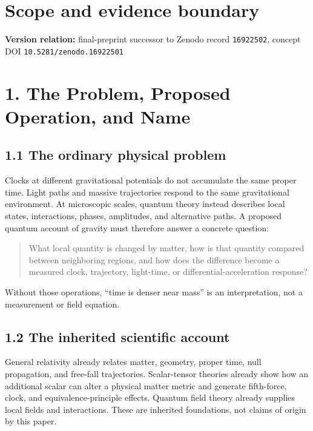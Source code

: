 \documentclass[
  american,
  11pt,
  letterpaper,
]{article}
\begin{document}
\section{Scope and evidence boundary}\label{scope-and-evidence-boundary}

\textbf{Version relation:} final-preprint successor to Zenodo record \texttt{16922502}, concept DOI \nolinkurl{10.5281/zenodo.16922501}

\section{1. The Problem, Proposed Operation, and Name}\label{the-problem-proposed-operation-and-name}

\subsection{1.1 The ordinary physical problem}\label{the-ordinary-physical-problem}

Clocks at different gravitational potentials do not accumulate the same proper time. Light paths and massive trajectories respond to the same gravitational environment. At microscopic scales, quantum theory instead describes local states, interactions, phases, amplitudes, and alternative paths. A proposed quantum account of gravity must therefore answer a concrete question:

\begin{quote}
What local quantity is changed by matter, how is that quantity compared between neighboring regions, and how does the difference become a measured clock, trajectory, light-time, or differential-acceleration response?
\end{quote}

Without those operations, ``time is denser near mass'' is an interpretation, not a measurement or field equation.

\subsection{1.2 The inherited scientific account}\label{the-inherited-scientific-account}

General relativity already relates matter, geometry, proper time, null propagation, and free-fall trajectories. Scalar-tensor theories already show how an additional scalar can alter a physical matter metric and generate fifth-force, clock, and equivalence-principle effects. Quantum field theory already supplies local fields and interactions. These are inherited foundations, not claims of origin by this paper.
\end{document}
